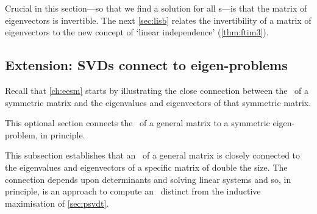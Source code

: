 Crucial in this section---so that we find a solution for all s---is that the matrix of eigenvectors is invertible.
The next \autoref{sec:lisb} relates the invertibility of a matrix of eigenvectors to the new concept of `linear independence' (\autoref{thm:ftim3}).

\subsection{Extension: SVDs connect to eigen-problems}

Recall that \autoref{ch:eesm} starts by illustrating the close connection between the \svd\ of a symmetric matrix and the eigenvalues and eigenvectors of that symmetric matrix.
\begin{aside}
This optional section connects the \svd\ of a general matrix to a symmetric eigen-problem, in principle.
\end{aside}%
This subsection establishes that an \svd\ of a general matrix is closely connected to the eigenvalues and eigenvectors of a specific matrix of double the size.   
The connection depends upon determinants and solving linear systems and so, in principle, is an approach to compute an \svd\ distinct from the inductive maximisation of \autoref{sec:psvdt}.



